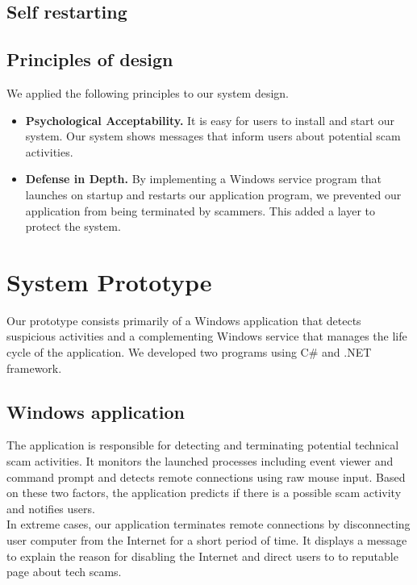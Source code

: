 \documentclass[final]{IEEEtran}
\begin{document}
\subsection{Self restarting}

\subsection{Principles of design}
We applied the following principles to our system design.
\begin{itemize}
  \item\textbf{ Psychological Acceptability.} It is easy for users to install and start our system. Our system shows messages that inform users about potential scam activities. 
  \item\textbf{ Defense in Depth.} By implementing a Windows service program that launches on startup and restarts our application program, we prevented our application from being terminated by scammers. This added a layer to protect the system. 
\end{itemize}

\section{System Prototype} %
Our prototype consists primarily of a Windows application that detects suspicious activities and a complementing Windows service that manages the life cycle of the application. We developed two programs using C\# and .NET framework. 

\subsection{Windows application}
The application is responsible for detecting and terminating potential technical scam activities. It monitors the launched processes including event viewer and command prompt and detects remote connections using raw mouse input. Based on these two factors, the application predicts if there is a possible scam activity and notifies users.\\
In extreme cases, our application terminates remote connections by disconnecting user computer from the Internet for a short period of time. It displays a message to explain the reason for disabling the Internet and direct users to to reputable page about tech scams.
\end{document}
